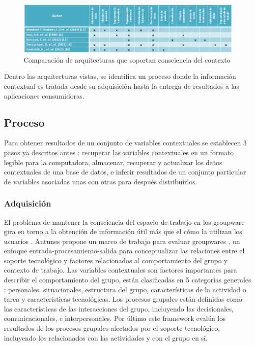 \begin{figure}[h!]
  \centering
    \includegraphics[scale=0.7]{images/comparaciones.png}
  \caption{Comparaci\'on de arquitecturas que soportan consciencia del contexto\cite{montane2013context}\cite{dey1999architecture}\cite{kamoun2012fadyrcos}\cite{decouchant2013adapting}\cite{guermah2013ontology}}
  \label{cmp:fig}
\end{figure}

Dentro las arquitecturas vistas, se identifica un proceso donde la informaci\'on contextual es tratada desde su adquisici\'on hasta la entrega de resultados a las aplicaciones consumidoras.

\subsection{Proceso}

Para obtener resultados de un conjunto de variables contextuales se establecen 3 pasos ya descritos antes \cite{montane2013context}: recuperar las variables contextuales en un formato legible para la computadora, almacenar, recuperar y actualizar los datos contextuales de una base de datos, e inferir resultados de un conjunto particular de variables asociadas unas con otras para despu\'es distribuirlos.

\subsubsection {Adquisici\'on}
El problema de mantener la consciencia del espacio de trabajo en los groupware gira en torno a la obtenci\'on de informaci\'on \'util m\'as que el c\'omo la utilizan los usuarios \cite{ardissono2012context}. Antunes propone un marco de trabajo para evaluar groupwares \cite{antunes2008structuring}, un enfoque entrada-procesamiento-salida para conceptualizar las relaciones entre el soporte tecnol\'ogico y factores relacionados al comportamiento del grupo y contexto de trabajo. Las variables contextuales son factores importantes para describir el comportamiento del grupo, est\'an clasificadas en 5 categor\'ias generales \cite{antunes2008structuring}: personales, situacionales, estructura del grupo, caracter\'isticas de la actividad o tarea y caracter\'isticas tecnol\'ogicas. Los procesos grupales est\'an definidas como las caracter\'isticas de las interacciones del grupo, incluyendo las decisionales, comunicacionales, e interpersonales. Por \'ultimo este framework eval\'ua los resultados de los procesos grupales afectados por el soporte tecnol\'ogico, incluyendo los relacionados con las actividades y con el grupo en s\'i.

